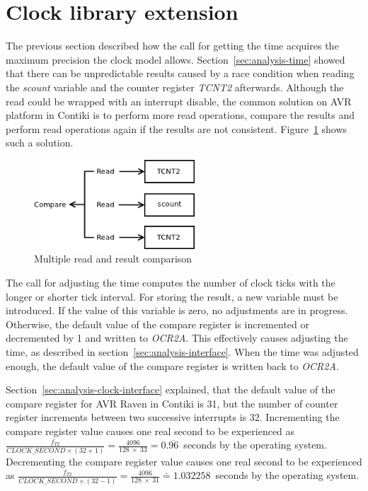 
\section{Clock library extension}\label{sec:design-clock}
The previous section described how the call for getting the time acquires
the maximum precision the clock model allows.
Section~\ref{sec:analysis-time} showed that there can be unpredictable
results caused by a race condition when reading the {\it{scount}} variable
and the counter register {\it{TCNT2}} afterwards.
Although the read could be wrapped with an interrupt disable,
the common solution on AVR platform in Contiki is to perform more read operations,
compare the results and perform read operations again if the results are not consistent.
Figure~\ref{fig:design-read} shows such a solution.

\begin{figure}
  \centering
  \includegraphics[width=6cm,keepaspectratio]{fig/read.png}
  \caption{Multiple read and result comparison}
  \label{fig:design-read}
\end{figure}

The call for adjusting the time computes the number of clock ticks
with the longer or shorter tick interval.
For storing the result, a new variable must be introduced.
If the value of this variable is zero, no adjustments are in progress.
Otherwise, the default value of the compare register is incremented or decremented by 1
and written to {\it{OCR2A}}.
This effectively causes adjusting the time, as described in section~\ref{sec:analysis-interface}.
When the time was adjusted enough,
the default value of the compare register is written back to {\it{OCR2A}}.

Section~\ref{sec:analysis-clock-interface} explained, that the default value
of the compare register for AVR Raven in Contiki is 31,
but the number of counter register increments between two successive interrupts is 32.
Incrementing the compare register value causes one real second to be experienced as
$\frac{f_{T2}}{CLOCK\_SECOND \times (32 + 1)} = \frac{4096}{128~\times~33} = 0.\overline{96}$~seconds
by the operating system.
Decrementing the compare register value causes one real second to be experienced as
$\frac{f_{T2}}{CLOCK\_SECOND \times (32 - 1)} = \frac{4096}{128~\times~31} \doteq 1.032258$~seconds
by the operating system.


